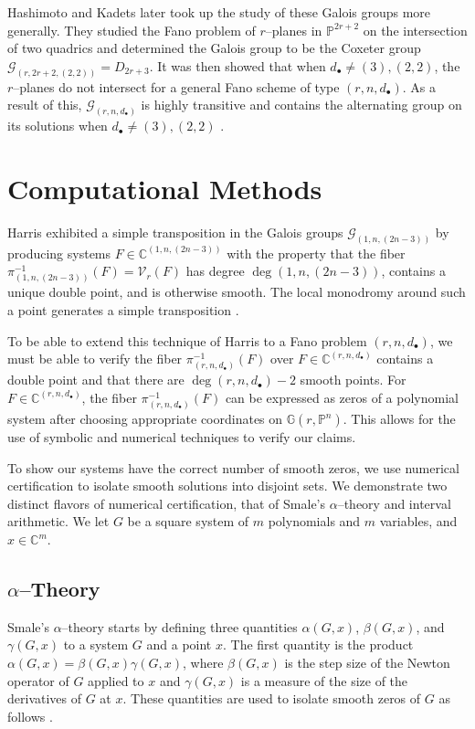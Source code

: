 \documentclass[12pt]{amsart}
\theoremstyle{definition}
\newcommand{\gal}{\mathcal{G}}
\begin{document}
Hashimoto and Kadets later took up the study of these Galois groups more generally. They studied the Fano problem of $r$--planes in $\mathbb{P}^{2r+2}$ on the intersection of two quadrics and determined the Galois group to be the Coxeter group $\gal_{(r,2r+2,(2,2))} = D_{2r+3}$. It was then showed that when $d_\bullet\ne(3),(2,2)$, the $r$--planes do not intersect for a general Fano scheme of type $(r,n,d_\bullet)$. As a result of this, $\gal_{(r,n,d_\bullet)}$ is highly transitive and contains the alternating group on its solutions when $d_\bullet\ne(3),(2,2)$ \cite{HK}.



\section{Computational Methods}
Harris exhibited a simple transposition in the Galois groups $\gal_{(1,n,(2n-3))}$ by producing systems $F\in\mathbb{C}^{(1,n,(2n-3))}$ with the property that the fiber $\pi_{(1,n,(2n-3))}^{-1}(F)=\mathcal{V}_r(F)$ has degree $\deg(1,n,(2n-3))$, contains a unique double point, and is otherwise smooth. The local monodromy around such a point generates a simple transposition \cite{Harris}. 

To be able to extend this technique of Harris to a Fano problem $(r,n,d_\bullet)$, we must be able to verify the fiber $\pi_{(r,n,d_\bullet)}^{-1}(F)$ over $F\in\mathbb{C}^{(r,n,d_\bullet)}$ contains a double point and that there are $\deg(r,n,d_\bullet)-2$ smooth points. For $F\in\mathbb{C}^{(r,n,d_\bullet)}$, the fiber $\pi_{(r,n,d_\bullet)}^{-1}(F)$ can be expressed as zeros of a polynomial system after choosing appropriate coordinates on $\mathbb{G}(r,\mathbb{P}^n)$. This allows for the use of symbolic and numerical techniques to verify our claims. 

To show our systems have the correct number of smooth zeros, we use numerical certification to isolate smooth solutions into disjoint sets. We demonstrate two distinct flavors of numerical certification, that of Smale's $\alpha$--theory and interval arithmetic. We let $G$ be a square system of $m$ polynomials and $m$ variables, and $x\in\mathbb{C}^m$.

\subsection*{$\alpha$--Theory}
Smale's $\alpha$--theory starts by defining three quantities $\alpha(G,x)$, $\beta(G,x)$, and $\gamma(G,x)$ to a system $G$ and a point $x$. The first quantity is the product $\alpha(G,x) = \beta(G,x)\gamma(G,x)$, where $\beta(G,x)$ is the step size of the Newton operator of $G$ applied to $x$ and $\gamma(G,x)$ is a measure of the size of the derivatives of $G$ at $x$. These quantities are used to isolate smooth zeros of $G$ as follows \cite{SmaleShub}.
\end{document}
